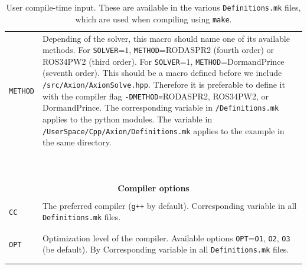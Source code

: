 \documentclass[11pt,a4paper]{article}
\begin{document}
\begin{table}[h!]
\begin{tabular}{l l}
		{\tt METHOD}& \multirow{1}{12cm}{Depending of the solver, this macro should name one of its available methods. 
		For {\tt SOLVER}=$1$, {\tt METHOD}=RODASPR2 (fourth order) or ROS34PW2 (third order). 	
		For {\tt SOLVER}=$1$, {\tt METHOD}=DormandPrince (seventh order). This should be a macro defined before we include {\tt \mimes/src/Axion/AxionSolve.hpp}. Therefore it is preferable to 
		define it with the compiler flag {\tt -DMETHOD=}RODASPR2, ROS34PW2, or DormandPrince.
		The corresponding variable in {\tt \mimes/Definitions.mk} applies to the python modules. The variable in {\tt \mimes/UserSpace/Cpp/Axion/Definitions.mk} applies to the example in the same directory.}\\\\\\\\\\\\\\\\\\\\ 		
		\hline\\[-0.4cm]
		
		\multicolumn{2}{c}{\bf Compiler options}  \\
		\hline\\[-0.4cm]
		
		{\tt CC} &  \multirow{1}{12cm}{The preferred \CPP compiler ({\tt g++} by default). Corresponding variable in all {\tt Definitions.mk} files.} \\\\
		\hline\\[-0.4cm]
		
		{\tt OPT} &  \multirow{1}{12cm}{Optimization level of the compiler. Available options {\tt OPT}={\tt O1}, {\tt O2}, {\tt O3} (be default). By Corresponding variable in all {\tt Definitions.mk} files.}   \\\\
		\hline\\[-0.4cm]

	\end{tabular}
	\caption{User compile-time input. These are available in the various {\tt Definitions.mk} files, which are used when compiling using {\tt make}.}
	\label{tab:compile_time-input}
\end{table}



\pagebreak
{}
                        
\end{document}
